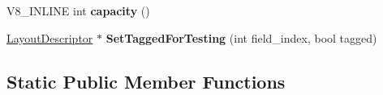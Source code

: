 \begin{DoxyCompactItemize}
\item 
V8\+\_\+\+I\+N\+L\+I\+NE int {\bfseries capacity} ()\hypertarget{classv8_1_1internal_1_1_layout_descriptor_a3748b4375e526aee46428dfaa1dd3120}{}\label{classv8_1_1internal_1_1_layout_descriptor_a3748b4375e526aee46428dfaa1dd3120}

\item 
\hyperlink{classv8_1_1internal_1_1_layout_descriptor}{Layout\+Descriptor} $\ast$ {\bfseries Set\+Tagged\+For\+Testing} (int field\+\_\+index, bool tagged)\hypertarget{classv8_1_1internal_1_1_layout_descriptor_afb2ff0827af7b839818ccba3276c489f}{}\label{classv8_1_1internal_1_1_layout_descriptor_afb2ff0827af7b839818ccba3276c489f}

\end{DoxyCompactItemize}
\subsection*{Static Public Member Functions}
